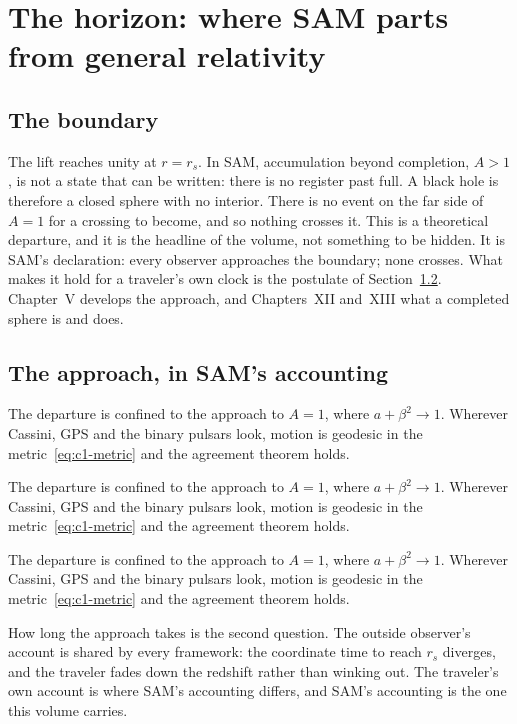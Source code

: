 \section{The horizon: where SAM parts from general relativity}
\label{sec:c1-home}

\subsection{The boundary}

The lift reaches unity at $r=r_s$. In SAM, accumulation beyond completion, $A>1$, is not a state that can be written: there is no register past full. A black hole is therefore a closed sphere with no interior. There is no event on the far side of $A=1$ for a crossing to become, and so nothing crosses it. This is a theoretical departure, and it is the headline of the volume, not something to be hidden. It is SAM's declaration: every observer approaches the boundary; none crosses. What makes it hold for a traveler's own clock is the postulate of Section~\ref{sec:c1-approach}. Chapter~V develops the approach, and Chapters~XII and~XIII what a completed sphere is and does.

\subsection{The approach, in SAM's accounting}
\label{sec:c1-approach}

The departure is confined to the approach to $A=1$, where $a+\beta^2\to1$. Wherever Cassini, GPS and the binary pulsars look, motion is geodesic in the metric~\eqref{eq:c1-metric} and the agreement theorem holds.
\label{sec:c1-approach}

The departure is confined to the approach to $A=1$, where $a+\beta^2\to1$. Wherever Cassini, GPS and the binary pulsars look, motion is geodesic in the metric~\eqref{eq:c1-metric} and the agreement theorem holds.
\label{sec:c1-approach}

The departure is confined to the approach to $A=1$, where $a+\beta^2\to1$. Wherever Cassini, GPS and the binary pulsars look, motion is geodesic in the metric~\eqref{eq:c1-metric} and the agreement theorem holds.

How long the approach takes is the second question. The outside observer's account is shared by every framework: the coordinate time to reach $r_s$ diverges, and the traveler fades down the redshift rather than winking out. The traveler's own account is where SAM's accounting differs, and SAM's accounting is the one this volume carries.

